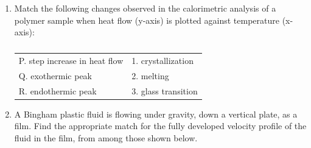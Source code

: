 \documentclass[a4paper,10pt]{article}
\begin{document}
\begin{enumerate}[label=\Alph*)]
    \hfill{}
    \begin{enumerate}[label=\Alph*)]
    \end{enumerate}

    \item Match the following changes observed in the calorimetric analysis of a polymer sample when heat flow (y-axis) is plotted against temperature (x-axis):
    \begin{table}[h!] \centering \caption*{} \label{tab:q8_polymer}
        \begin{tabular}{ll} \hline
            P. step increase in heat flow & 1. crystallization \\
            Q. exothermic peak & 2. melting \\
            R. endothermic peak & 3. glass transition \\ \hline
        \end{tabular}
    \end{table}
    
    \hfill{}
    \begin{enumerate}[label=\Alph*)]
    \end{enumerate}
    
    \item A Bingham plastic fluid is flowing under gravity, down a vertical plate, as a film. Find the appropriate match for the fully developed velocity profile of the fluid in the film, from among those shown below.
    

\end{enumerate}
\end{document}
